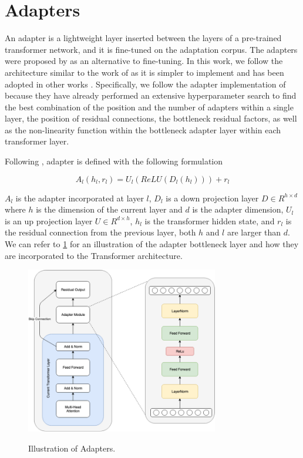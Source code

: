 \section{Adapters}
\label{sec:bm_adapters}
An adapter is a lightweight layer inserted between the layers of a pre-trained transformer network, and it is fine-tuned on the adaptation corpus. The adapters were proposed by  as an alternative to fine-tuning. In this work, we follow the architecture similar to the work of  as it is simpler to implement and has been adopted in other works . Specifically, we follow the adapter implementation of  because they have already performed an extensive hyperparameter search to find the best combination of the position and the number of adapters within a single layer, the position of residual connections, the bottleneck residual factors, as well as the non-linearity function within the bottleneck adapter layer within each transformer layer.

Following , adapter is defined with the following formulation

$$A_l(h_l, r_l) = U_l(ReLU(D_l(h_l))) + r_l $$

$A_l$ is the adapter incorporated at layer $l$, $D_l$ is a down projection layer $D \in R^{h \times d}$ where $h$ is the dimension of the current layer and $d$ is the adapter dimension, $U_l$ is an up projection layer $U \in R^{d \times h}$, $h_l$ is the transformer hidden state, and $r_l$ is the residual connection from the previous layer, both $h$ and $l$ are larger than $d$. We can refer to \cref{img:adapters} for an illustration of the adapter bottleneck layer and how they are incorporated to the Transformer architecture.

\begin{figure}[h]
    {\includegraphics[width=0.75\textwidth]{img/adapter_module.png}}
    \centering
    \caption{Illustration of Adapters.}
    \label{img:adapters}
\end{figure}

